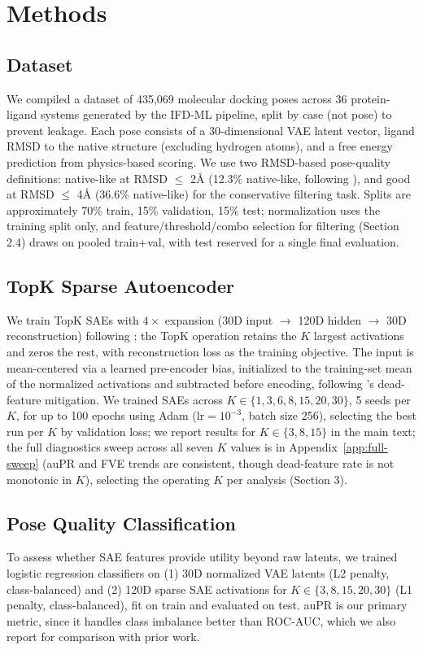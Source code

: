 \documentclass{article}
\begin{document}
\section{Methods}
\subsection{Dataset}

We compiled a dataset of 435,069 molecular docking poses across 36 protein-ligand systems generated by the IFD-ML pipeline, split by case (not pose) to prevent leakage. Each pose consists of a 30-dimensional VAE latent vector, ligand RMSD to the native structure (excluding hydrogen atoms), and a free energy prediction from physics-based scoring. We use two RMSD-based pose-quality definitions: native-like at RMSD $\le$ 2Å (12.3\% native-like, following \citet{shim2022}), and good at RMSD $\le$ 4Å (36.6\% native-like) for the conservative filtering task. Splits are approximately 70\% train, 15\% validation, 15\% test; normalization uses the training split only, and feature/threshold/combo selection for filtering (Section 2.4) draws on pooled train+val, with test reserved for a single final evaluation.

\subsection{TopK Sparse Autoencoder}

We train TopK SAEs with $4\times$ expansion (30D input $\to$ 120D hidden $\to$ 30D reconstruction) following \citet{adams2025}; the TopK operation retains the $K$ largest activations and zeros the rest, with reconstruction loss as the training objective. The input is mean-centered via a learned pre-encoder bias, initialized to the training-set mean of the normalized activations and subtracted before encoding, following \citet{simon2026}'s dead-feature mitigation. We trained SAEs across $K \in \{1, 3, 6, 8, 15, 20, 30\}$, 5 seeds per $K$, for up to 100 epochs using Adam ($\text{lr}=10^{-3}$, batch size 256), selecting the best run per $K$ by validation loss; we report results for $K \in \{3, 8, 15\}$ in the main text; the full diagnostics sweep across all seven $K$ values is in Appendix~\ref{app:full-sweep} (auPR and FVE trends are consistent, though dead-feature rate is not monotonic in $K$), selecting the operating $K$ per analysis (Section 3).

\subsection{Pose Quality Classification}
To assess whether SAE features provide utility beyond raw latents, we trained logistic regression classifiers on (1) 30D normalized VAE latents (L2 penalty, class-balanced) and (2) 120D sparse SAE activations for $K \in \{3, 8, 15, 20, 30\}$ (L1 penalty, class-balanced), fit on train and evaluated on test. auPR is our primary metric, since it handles class imbalance better than ROC-AUC, which we also report for comparison with prior work.
\end{document}
